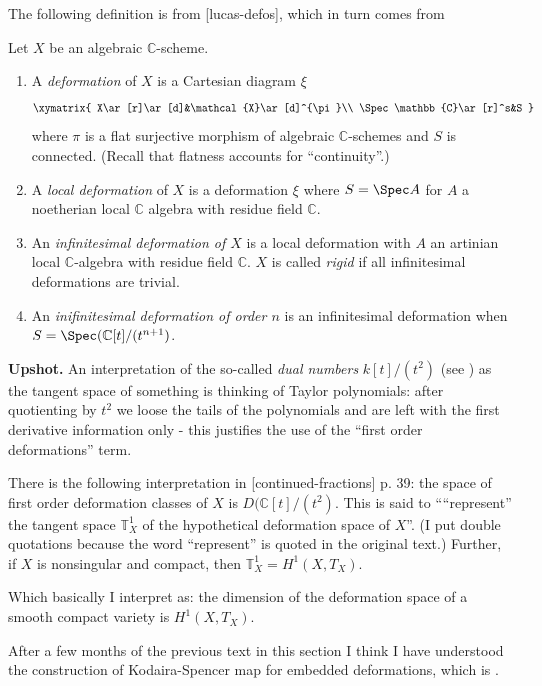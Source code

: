 \documentclass{book}
\begin{document}
\medskip\noindent
The following definition is from
[lucas-defos], which in turn comes from
\cite{Sernesi-deformations}

\begin{definition}
\label{definition-deformation}
Let $X$ be an algebraic $\mathbb{C}$-scheme.
\begin{enumerate}
\item A {\it deformation} of $X$ is a
Cartesian diagram $\xi$
$$
\xymatrix{
X\ar[r]\ar[d]&\mathcal{X}\ar[d]^{\pi}\\
\Spec \mathbb{C}\ar[r]^s&S
}
$$
where $\pi$ is a flat surjective morphism of
algebraic $\mathbb{C}$-schemes and
$S$ is connected. (Recall that flatness
accounts for ``continuity''.)
\item A {\it local deformation} of $X$ is a
deformation $\xi$ where
$S=\Spec A$ for $A$ a noetherian local
$\mathbb{C}$ algebra with residue
field $\mathbb{C}$.
\item An {\it infinitesimal deformation of
$X$} is a local deformation with $A$
an artinian local $\mathbb{C}$-algebra with
residue field $\mathbb{C}$. $X$ is
called {\it rigid} if all infinitesimal
deformations are trivial.
\item An {\it inifinitesimal deformation of
order $n$} is an infinitesimal
deformation when $S=\Spec
(\mathbb{C}[t]/(t^{n+1})$.
\end{enumerate}
\end{definition}

{\bf Upshot.} An interpretation of the
so-called {\it dual numbers}
$k[t]/(t^2)$ (see
\cite{Hartshorne-deformation}) as the tangent
space of
something is thinking of Taylor polynomials:
after quotienting by $t^2$ we loose
the tails of the polynomials and are left
with the first derivative information
only - this justifies the use of the ``first
order deformations'' term.

There is the following interpretation in
[continued-fractions] p. 39: the space
of first order deformation classes of $X$ is
$D(\mathbb{C}[t]/(t^2)$. This is
said to ````represent'' the tangent space
$\mathbb{T}^1_X$ of the hypothetical
deformation space of $X$''. (I put double
quotations because the word
``represent'' is quoted in the original
text.) Further, if $X$ is nonsingular
and compact, then
$\mathbb{T}^1_X=H^{1}(X,T_X)$.

Which basically I interpret as: the dimension
of the deformation space of a
smooth compact variety is $H^{1}(X,T_X)$.

\medskip\noindent
After a few months of the previous text in
this section
I think I have understood the construction of
Kodaira-Spencer map for embedded
deformations,
which is \cite[Proposition
3.2.1(ii)]{Sernesi-deformations}.
\end{document}

